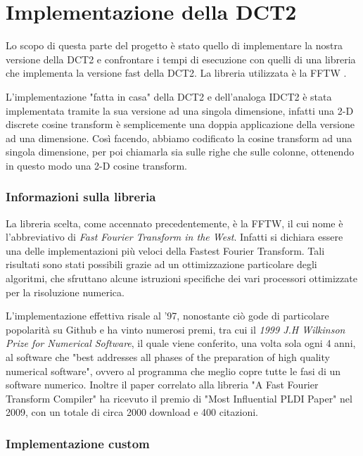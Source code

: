 	
\part{Implementazione della DCT2}

Lo scopo di questa parte del progetto è stato quello di implementare la nostra versione della DCT2 e confrontare i tempi di esecuzione con quelli di una libreria che implementa la versione fast della DCT2. La libreria utilizzata è la FFTW \cite{fftw}.

L'implementazione "fatta in casa" della DCT2 e dell'analoga IDCT2 è stata implementata tramite la sua versione ad una singola dimensione, infatti una 2-D discrete cosine transform è semplicemente una doppia applicazione della versione ad una dimensione. Così facendo, abbiamo codificato la cosine transform ad una singola dimensione, per poi chiamarla sia sulle righe che sulle colonne, ottenendo in questo modo una 2-D cosine transform.

\section{Informazioni sulla libreria}

La libreria scelta, come accennato precedentemente, è la FFTW, il cui nome è l'abbreviativo di \textit{Fast Fourier Transform in the West}. Infatti si dichiara essere una delle implementazioni più veloci della Fastest Fourier Transform. Tali risultati sono stati possibili grazie ad un ottimizzazione particolare degli algoritmi, che sfruttano alcune istruzioni specifiche dei vari processori ottimizzate per la risoluzione numerica.

L'implementazione effettiva risale al '97, nonostante ciò gode di particolare popolarità su Github\cite{Github} e ha vinto numerosi premi, tra cui il \textit{1999 J.H Wilkinson Prize for Numerical Software}, il quale viene conferito, una volta sola ogni 4 anni, al software che "best addresses all phases of the preparation of high quality numerical software", ovvero al programma che meglio copre tutte le fasi di un software numerico. Inoltre il paper correlato alla libreria "A Fast Fourier Transform Compiler"\cite{fftw_paper} ha ricevuto il premio di "Most Influential PLDI Paper" nel 2009, con un totale di circa 2000 download e 400 citazioni.

\section{Implementazione custom}

